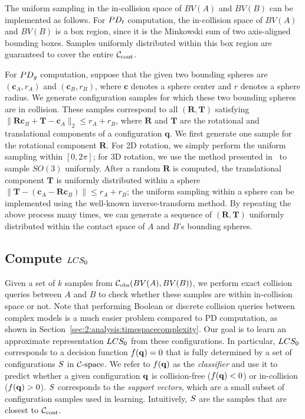 The uniform sampling in the in-collision space of $BV(A)$ and $BV(B)$ can be implemented as follows. 
For $PD_t$ computation, the in-collision space of $BV(A)$ and $BV(B)$ is a box region, since it is the Minkowski sum of two axis-aligned bounding boxes. Samples uniformly distributed within this box region are guaranteed to cover the entire $\mathcal C_\text{cont}$.

For $PD_g$ computation, suppose that the given two bounding spheres are $(\mathbf c_A, r_A)$ and
$(\mathbf c_B, r_B)$, where $\mathbf c$ denotes a sphere center and $r$ denotes a sphere radius. We generate configuration samples for which these two bounding spheres are in collision. These samples correspond to all $(\mathbf R, \mathbf T)$ satisfying $\|\mathbf R \mathbf c_B + \mathbf T - \mathbf c_A\|_2 \leq r_A + r_B$, where $\mathbf R$ and $\mathbf T$ are the rotational and translational components of a configuration $\mathbf q$. We first generate one sample for the rotational component $\mathbf R$. For 2D rotation, we simply perform the uniform sampling within $[0, 2\pi]$; for 3D rotation, we use the method presented in~\cite{Shoemake:1992:URR} to sample $SO(3)$ uniformly. After a random $\mathbf R$ is computed, the translational component $\mathbf T$ is uniformly distributed within a sphere $\|\mathbf T - (\mathbf c_A - \mathbf R \mathbf c_B)\| \leq r_A + r_B$; the uniform sampling within a sphere can be implemented using the well-known inverse-transform method. By repeating the above process many times, we can generate a sequence of $(\mathbf R, \mathbf T)$ uniformly distributed within the contact space of $A$ and $B$'s bounding spheres.

\subsection{Compute $LCS_0$} \label{sec:2:offline:model}
Given a set of $k$ samples from
$\mathcal C_{\text{obs}}(BV(A),BV(B))$, we perform exact collision queries between $A$ and $B$ to
check whether these samples are within in-collision space or not. Note that performing Boolean or discrete collision queries between complex models is a much easier problem compared to PD computation, as shown in Section~\ref{sec:2:analysis:timespacecomplexity}.
Our goal is to learn an approximate representation $LCS_0$ from these
configurations. In particular, $LCS_0$ corresponds to a decision function
$f(\mathbf q)=0$ that is fully determined by a set of configurations $S$
in $\mathcal C\text{-space}$. We refer to $f(\mathbf q)$ as the \emph{classifier} and use it to
predict whether a given configuration $\mathbf q$ is collision-free
($f(\mathbf q)<0$) or in-collision ($f(\mathbf q)>0$). $S$ corresponds to the \emph{support vectors}, which are a
small subset of configuration samples used in learning.
Intuitively, $S$ are the samples that are closest to $\mathcal C_\text{cont}$.

